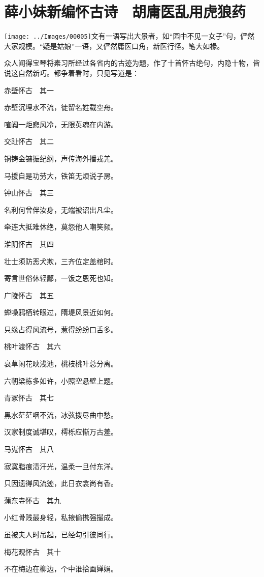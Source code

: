
\chapter{薛小妹新编怀古诗　胡庸医乱用虎狼药}

{\texttt{[image: ../Images/00005]}\kaishu 文有一语写出大景者，如``园中不见一女子''句，俨然大家规模。``疑是姑娘''一语，又俨然庸医口角，新医行径。笔大如椽。}

众人闻得宝琴将素习所经过各省内的古迹为题，作了十首怀古绝句，内隐十物，皆说这自然新巧。都争着看时，只见写道是：

赤壁怀古　其一

赤壁沉埋水不流，徒留名姓载空舟。

喧阗一炬悲风冷，无限英魂在内游。

交趾怀古　其二

铜铸金镛振纪纲，声传海外播戎羌。

马援自是功劳大，铁笛无烦说子房。

钟山怀古　其三

名利何曾伴汝身，无端被诏出凡尘。

牵连大抵难休绝，莫怨他人嘲笑频。

淮阴怀古　其四

壮士须防恶犬欺，三齐位定盖棺时。

寄言世俗休轻鄙，一饭之恩死也知。

广陵怀古　其五

蝉噪鸦栖转眼过，隋堤风景近如何。

只缘占得风流号，惹得纷纷口舌多。

桃叶渡怀古　其六

衰草闲花映浅池，桃枝桃叶总分离。

六朝梁栋多如许，小照空悬壁上题。

青冢怀古　其七

黑水茫茫咽不流，冰弦拨尽曲中愁。

汉家制度诚堪叹，樗栎应惭万古羞。

马嵬怀古　其八

寂寞脂痕渍汗光，温柔一旦付东洋。

只因遗得风流迹，此日衣衾尚有香。

蒲东寺怀古　其九

小红骨贱最身轻，私掖偷携强撮成。

虽被夫人时吊起，已经勾引彼同行。

梅花观怀古　其十

不在梅边在柳边，个中谁拾画婵娟。

